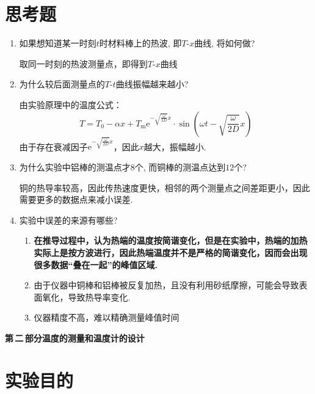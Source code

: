 \documentclass[11pt]{article}
\newcommand{\chapter}[2]{\begin{center}\bf\Large{第\,#1\,部分\quad #2}\end{center}}
\begin{document}
\section{思考题}

\begin{enumerate}
	
	\item 如果想知道某一时刻$t$时材料棒上的热波, 即$T$-$x$曲线, 将如何做? 
	
	取同一时刻的热波测量点，即得到$T$-$x$曲线
	
	\item 为什么较后面测量点的$T$-$t$曲线振幅越来越小? 
	
	由实验原理中的温度公式：
	\[
	T = T_0 - \alpha x + T_{\mathrm{m}} \mathrm{e}^{-\sqrt{\frac{\omega}{2D}}x} \cdot \sin \left( \omega t - \sqrt{\frac{\omega}{2D}}x \right)
	\]
	由于存在衰减因子$\mathrm{e}^{-\sqrt{\frac{\omega}{2D}}x}$，因此$x$越大，振幅越小.
	
	\item 为什么实验中铝棒的测温点才$8$个, 而铜棒的测温点达到$12$个? 
	
	铜的热导率较高，因此传热速度更快，相邻的两个测量点之间差距更小，因此需要更多的数据点来减小误差.
	
	\item 实验中误差的来源有哪些? 
	\begin{enumerate}
		\item \textbf{在推导过程中，认为热端的温度按简谐变化，但是在实验中，热端的加热实际上是按方波进行，因此热端温度并不是严格的简谐变化，因而会出现很多数据“叠在一起”的峰值区域.}
		\item 由于仪器中铜棒和铝棒被反复加热，且没有利用砂纸摩擦，可能会导致表面氧化，导致热导率变化.
		\item 仪器精度不高，难以精确测量峰值时间
	\end{enumerate}

	
\end{enumerate}

\newpage
\setcounter{section}{0}

\chapter{二}{温度的测量和温度计的设计}





\section{实验目的}
\end{document}

